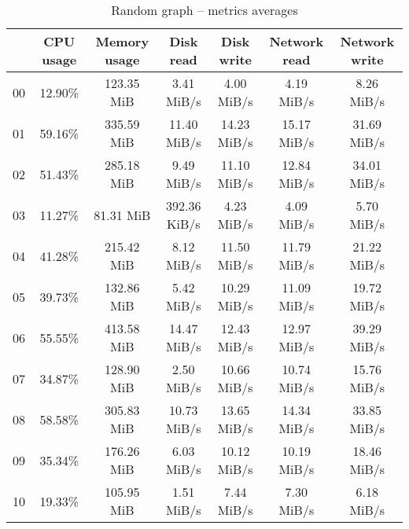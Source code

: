 \begin{table}[H]
\begin{center}
\caption{Random graph -- metrics averages}
\label{tab:graph-random-avg}
\begin{tabular}{|c|c|c|c|c|c|c|}
\hline
   & CPU usage & Memory usage & Disk read & Disk write & Network read & Network write\\
\hline
00 & 12.90\% & 123.35 MiB & 3.41 MiB/s & 4.00 MiB/s & 4.19 MiB/s & 8.26 MiB/s\\
01 & 59.16\% & 335.59 MiB & 11.40 MiB/s & 14.23 MiB/s & 15.17 MiB/s & 31.69 MiB/s\\
02 & 51.43\% & 285.18 MiB & 9.49 MiB/s & 11.10 MiB/s & 12.84 MiB/s & 34.01 MiB/s\\
03 & 11.27\% & 81.31 MiB & 392.36 KiB/s & 4.23 MiB/s & 4.09 MiB/s & 5.70 MiB/s\\
04 & 41.28\% & 215.42 MiB & 8.12 MiB/s & 11.50 MiB/s & 11.79 MiB/s & 21.22 MiB/s\\
05 & 39.73\% & 132.86 MiB & 5.42 MiB/s & 10.29 MiB/s & 11.09 MiB/s & 19.72 MiB/s\\
06 & 55.55\% & 413.58 MiB & 14.47 MiB/s & 12.43 MiB/s & 12.97 MiB/s & 39.29 MiB/s\\
07 & 34.87\% & 128.90 MiB & 2.50 MiB/s & 10.66 MiB/s & 10.74 MiB/s & 15.76 MiB/s\\
08 & 58.58\% & 305.83 MiB & 10.73 MiB/s & 13.65 MiB/s & 14.34 MiB/s & 33.85 MiB/s\\
09 & 35.34\% & 176.26 MiB & 6.03 MiB/s & 10.12 MiB/s & 10.19 MiB/s & 18.46 MiB/s\\
10 & 19.33\% & 105.95 MiB & 1.51 MiB/s & 7.44 MiB/s & 7.30 MiB/s & 6.18 MiB/s\\
\hline
\end{tabular}
\end{center}
\end{table}
